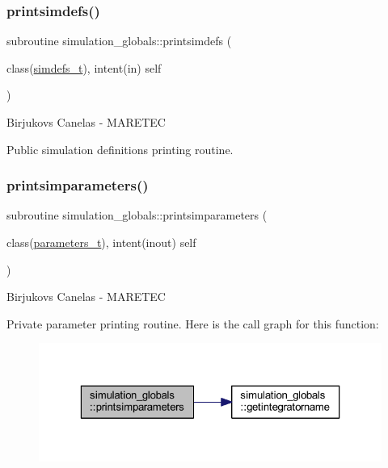 \subsubsection{\texorpdfstring{printsimdefs()}{printsimdefs()}}
{\footnotesize\ttfamily subroutine simulation\+\_\+globals\+::printsimdefs (\begin{DoxyParamCaption}\item[{class(\mbox{\hyperlink{structsimulation__globals_1_1simdefs__t}{simdefs\+\_\+t}}), intent(in)}]{self }\end{DoxyParamCaption})\hspace{0.3cm}{\ttfamily [private]}}



Birjukovs Canelas -\/ M\+A\+R\+E\+T\+EC 

Public simulation definitions printing routine. \mbox{\label{namespacesimulation__globals_a0b17b2f2e9e7dbbad7c9d735217c1ee1}} 
\subsubsection{\texorpdfstring{printsimparameters()}{printsimparameters()}}
{\footnotesize\ttfamily subroutine simulation\+\_\+globals\+::printsimparameters (\begin{DoxyParamCaption}\item[{class(\mbox{\hyperlink{structsimulation__globals_1_1parameters__t}{parameters\+\_\+t}}), intent(inout)}]{self }\end{DoxyParamCaption})\hspace{0.3cm}{\ttfamily [private]}}



Birjukovs Canelas -\/ M\+A\+R\+E\+T\+EC 

Private parameter printing routine. Here is the call graph for this function\+:
\nopagebreak
\begin{figure}[H]
\begin{center}
\leavevmode
\includegraphics[width=323pt]{namespacesimulation__globals_a0b17b2f2e9e7dbbad7c9d735217c1ee1_cgraph}
\end{center}
\end{figure}
\mbox{\label{namespacesimulation__globals_a1fc4653684d73efecdbd140b6cafe541}} 
